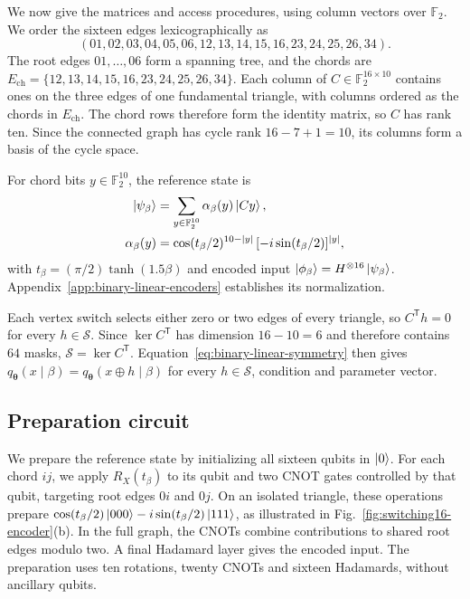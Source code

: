 \documentclass[pra,aps,10pt,twocolumn,floatfix,superscriptaddress, notitlepage,longbibliography]{revtex4-2}
\begin{document}
We now give the matrices and access procedures, using column vectors over $\mathbb F_2$. We order the sixteen edges lexicographically as
\begin{equation}
 (01,02,03,04,05,06,12,13,14,15,16,23,24,25,26,34).
\end{equation}
The root edges $01,\ldots,06$ form a spanning tree, and the chords are $E_{\mathrm{ch}}=\{12,13,14,15,16,23,24,25,26,34\}$. Each column of $C\in\mathbb F_2^{16\times10}$ contains ones on the three edges of one fundamental triangle, with columns ordered as the chords in $E_{\mathrm{ch}}$. The chord rows therefore form the identity matrix, so $C$ has rank ten. Since the connected graph has cycle rank $16-7+1=10$, its columns form a basis of the cycle space.

For chord bits $y\in\mathbb F_2^{10}$, the reference state is
\begin{align}
 \ket{\psi_\beta}
 &=\sum_{y\in\mathbb F_2^{10}}\alpha_\beta(y)\ket{Cy},\\
 \alpha_\beta(y)&=\cos(t_\beta/2)^{10-|y|}\,[-i\sin(t_\beta/2)]^{|y|},
\end{align}
with $t_\beta=(\pi/2)\tanh(1.5\beta)$ and encoded input $\ket{\phi_\beta}=H^{\otimes16}\ket{\psi_\beta}$. Appendix~\ref{app:binary-linear-encoders} establishes its normalization.

Each vertex switch selects either zero or two edges of every triangle, so $C^{\mathsf T}h=0$ for every $h\in\mathcal S$. Since $\ker C^{\mathsf T}$ has dimension $16-10=6$ and therefore contains $64$ masks, $\mathcal S=\ker C^{\mathsf T}$. Equation~\eqref{eq:binary-linear-symmetry} then gives $q_{\boldsymbol\theta}(x\mid\beta)=q_{\boldsymbol\theta}(x\oplus h\mid\beta)$ for every $h\in\mathcal S$, condition and parameter vector.

\subsection{Preparation circuit}

We prepare the reference state by initializing all sixteen qubits in $\ket{0}$. For each chord $ij$, we apply $R_X(t_\beta)$ to its qubit and two CNOT gates controlled by that qubit, targeting root edges $0i$ and $0j$. On an isolated triangle, these operations prepare $\cos(t_\beta/2)\ket{000}-i\sin(t_\beta/2)\ket{111}$, as illustrated in Fig.~\ref{fig:switching16-encoder}(b). In the full graph, the CNOTs combine contributions to shared root edges modulo two. A final Hadamard layer gives the encoded input. The preparation uses ten rotations, twenty CNOTs and sixteen Hadamards, without ancillary qubits.
\end{document}
